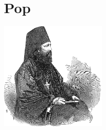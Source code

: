 \documentclass[11pt, twoside]{book}
\let\clearpage\relax
\begin{document}
\chapter{Pop}
\begin{center}
    \includegraphics[width=0.4\textwidth]{images/pop.png}
\end{center}
\pagestyle{pop}













\clearpage{\mbox{}\pagestyle{empty}\cleardoublepage}
\end{document}
